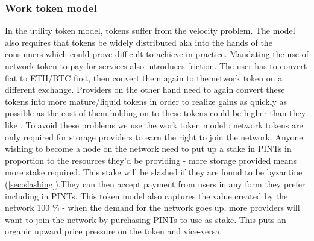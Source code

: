 \subsubsection{Work token model}
In the utility token model, tokens suffer from the velocity problem. The model also requires that tokens be widely distributed aka into the hands of the consumers which could prove difficult to achieve in practice. Mandating the use of network token to pay for services also introduces friction. The user has to convert fiat to ETH/BTC first, then convert them again to the network token on a different exchange. Providers on the other hand need to again convert these tokens into more mature/liquid tokens in order to realize gains as quickly as possible as the cost of them holding on to these tokens could be higher than they like \cite{moe}. 
\newline\newline
To avoid these problems we use the work token model \cite{new_model_utility_token}: network tokens are only required for storage providers to earn the right to join the network. Anyone wishing to become a node on the network need to put up a stake in PINTs in proportion to the resources they'd be providing - more storage provided means more stake required. This stake will be slashed if they are found to be byzantine (\cref{sec:slashing}).They can then accept payment from users in any form they prefer including in PINTs. This token model also captures the value created by the network 100 \% - when the demand for the network goes up, more providers will want to join the network by purchasing PINTs to use as stake. This puts an organic upward price pressure on the token and vice-versa.
